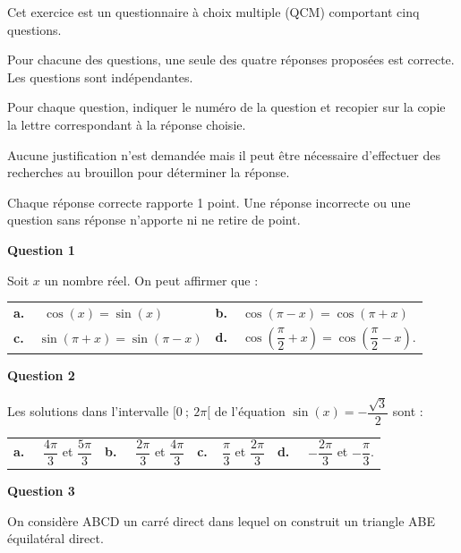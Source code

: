 \medskip

Cet exercice est un questionnaire à choix multiple (QCM) comportant cinq questions.

Pour chacune des questions, une seule des quatre réponses proposées est correcte. Les questions
sont indépendantes.

Pour chaque question, indiquer le numéro de la question et recopier sur la copie la lettre
correspondant à la réponse choisie.

Aucune justification n'est demandée mais il peut être nécessaire d'effectuer des recherches au
brouillon pour déterminer la réponse.

Chaque réponse correcte rapporte 1 point. Une réponse incorrecte ou une question sans réponse
n'apporte ni ne retire de point.

\medskip

\textbf{Question 1}

\medskip 

Soit $x$ un nombre réel. On peut affirmer que :

\medskip 
 
\begin{tabularx}{\linewidth}{*{2}{X}}
\textbf{a.~~} $\cos(x)=\sin(x)$ & \textbf{b.~~}$\cos(\pi-x)=\cos(\pi+x)$ \\\textbf{c.~~}$\sin(\pi+x)=\sin(\pi-x) $& \textbf{d.~~}$ \cos \left(\dfrac{\pi}{2}+ x\right) = \cos \left(\dfrac{\pi}{2}- x\right) $.
\end{tabularx}


\medskip

\textbf{Question 2}

\medskip 

Les solutions dans l'intervalle $[0~;~2\pi[$ de l'équation $\sin(x) = -\dfrac{\sqrt{3}}{2}$
 sont :
 
 \medskip
 
\begin{tabularx}{\linewidth}{*{4}{X}}
\textbf{a.~~} $\dfrac{4\pi}{3}$ et $\dfrac{5\pi}{3} $ &\textbf{b.~~} $\dfrac{2\pi}{3}$ et $\dfrac{4\pi}{3} $&\textbf{c.~~}$ \dfrac{\pi}{3}$ et $\dfrac{2\pi}{3}$& \textbf{d.~~} $-\dfrac{2\pi}{3}$ et $- \dfrac{\pi}{3}  $.
\end{tabularx}


\medskip

\textbf{Question 3}

\medskip 

On considère ABCD un carré direct dans lequel on construit un
triangle ABE équilatéral direct.

